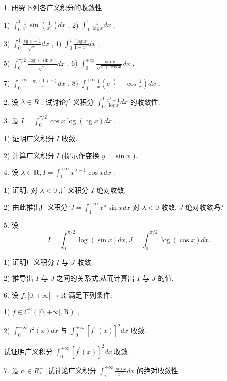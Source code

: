 1. 研究下列各广义积分的收敛性.

1) ${\int }_{0}^{1}\frac{1}{{x}^{2}}\sin \left( \frac{1}{{x}^{2}}\right) {dx}$ , 2) ${\int }_{0}^{1}\frac{1}{\log x}{dx}$ ,

3) ${\int }_{0}^{1}\frac{\operatorname{tg}x - 1}{\sqrt{x}}{dx}$ , 4) ${\int }_{0}^{1}\frac{\log x}{1 - {x}^{2}}{dx}$ ,

5) ${\int }_{0}^{\pi /2}\frac{\log \left( {\sin x}\right) }{\sqrt{x}}{dx}$ , 6) ${\int }_{0}^{+\infty }\frac{\sin x}{\sqrt{x + \cos x}}{dx}$ ,

7) ${\int }_{0}^{+\infty }\frac{\log \left( {1 + x}\right) }{{x}^{n}}{dx}$ , 8) ${\int }_{1}^{+\infty }\frac{1}{x}\left( {{e}^{-\frac{1}{x}} - \cos \frac{1}{x}}\right) {dx}$ .

2. 设 $\lambda  \in  R$ . 试讨论广义积分 ${\int }_{0}^{1}\frac{{x}^{\lambda } - 1}{\log x}{dx}$ 的收敛性.

3. 设 $I = {\int }_{0}^{\pi /2}\cos x\log \left( {\operatorname{tg}x}\right) {dx}$ .

1) 证明广义积分 $I$ 收敛.

2) 计算广义积分 $I$ (提示作变换 $y = \sin x$ ).

4. 设 $\lambda  \in  \mathbf{R},I = {\int }_{1}^{+\infty }{x}^{\lambda  - 1}\cos {xdx}$ .

1) 证明: 对 $\lambda  < 0$ ,广义积分 $I$ 绝对收敛.

2) 由此推出广义积分 $J = {\int }_{1}^{+\infty }{x}^{\lambda }\sin {xdx}$ 对 $\lambda  < 0$ 收敛. $J$ 绝对收敛吗?

5. 设
$$I = {\int }_{0}^{\pi /2}\log \left( {\sin x}\right) {dx},J = {\int }_{0}^{\pi /2}\log \left( {\cos x}\right) {dx}.$$

1) 证明广义积分 $I$ 与 $J$ 收敛.

2) 推导出 $I$ 与 $J$ 之间的关系式,从而计算出 $I$ 与 $J$ 的值.

6. 设 $f : \lbrack 0, + \infty \lbrack  \rightarrow  \mathrm{R}$ 满足下列条件:

1) $f \in  {C}^{2}\left( {\lbrack 0, + \infty \lbrack ,\mathrm{R}}\right)$ ,

2) ${\int }_{0}^{+\infty }{f}^{2}\left( x\right) {dx}$ 与 ${\int }_{0}^{+\infty }{\left\lbrack  {f}^{\prime \prime }\left( x\right) \right\rbrack  }^{2}{dx}$ 收敛.

试证明广义积分 ${\int }_{0}^{+\infty }{\left\lbrack  {f}^{\prime }\left( x\right) \right\rbrack  }^{2}{dx}$ 收敛.

7. 设 $\alpha  \in  {R}_{ * }^{ + }$ ,试讨论广义积分 ${\int }_{\pi }^{+\infty }\frac{\sin x}{{x}^{\alpha }}{dx}$ 的绝对收敛性.


